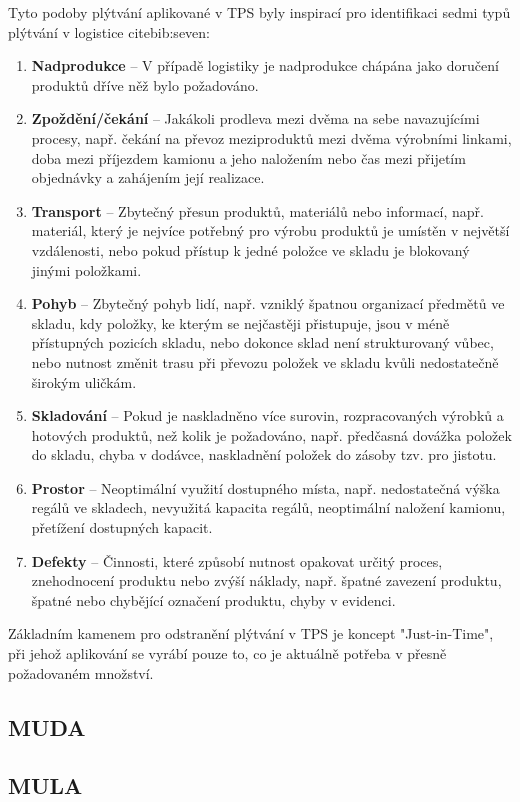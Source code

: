 Tyto podoby plýtvání aplikované v TPS byly inspirací pro identifikaci sedmi typů plýtvání v logistice cite{bib:seven}:
\begin{enumerate}
    \item \textbf{Nadprodukce} -- V případě logistiky je nadprodukce chápána jako doručení produktů dříve něž bylo požadováno.
    \item \textbf{Zpoždění/čekání} -- Jakákoli prodleva mezi dvěma na sebe navazujícími procesy, např. čekání na převoz meziproduktů mezi dvěma výrobními linkami, doba mezi příjezdem kamionu a jeho naložením nebo čas mezi přijetím objednávky a zahájením její realizace. 
    \item \textbf{Transport} -- Zbytečný přesun produktů, materiálů nebo informací, např. materiál, který je nejvíce potřebný pro výrobu produktů je umístěn v největší vzdálenosti, nebo pokud přístup k jedné položce ve skladu je blokovaný jinými položkami.
    \item \textbf{Pohyb} -- Zbytečný pohyb lidí, např. vzniklý špatnou organizací předmětů ve skladu, kdy položky, ke kterým se nejčastěji přistupuje, jsou v méně přístupných pozicích skladu, nebo dokonce sklad není strukturovaný vůbec, nebo nutnost změnit trasu při převozu položek ve skladu kvůli nedostatečně širokým uličkám.
    \item \textbf{Skladování} -- Pokud je naskladněno více surovin, rozpracovaných výrobků a hotových produktů, než kolik je požadováno, např. předčasná dovážka položek do skladu, chyba v dodávce, naskladnění položek do zásoby tzv. pro jistotu.
    \item \textbf{Prostor} -- Neoptimální využití dostupného místa, např. nedostatečná výška regálů ve skladech, nevyužitá kapacita regálů, neoptimální naložení kamionu, přetížení dostupných kapacit.
    \item \textbf{Defekty} -- Činnosti, které způsobí nutnost opakovat určitý proces, znehodnocení produktu nebo zvýší náklady, např. špatné zavezení produktu, špatné nebo chybějící označení produktu, chyby v evidenci.
\end{enumerate}

Základním kamenem pro odstranění plýtvání v TPS je koncept "Just-in-Time", při jehož aplikování se vyrábí pouze to, co je aktuálně potřeba v přesně požadovaném množství.

\subsection*{MUDA}
\subsection*{MULA}